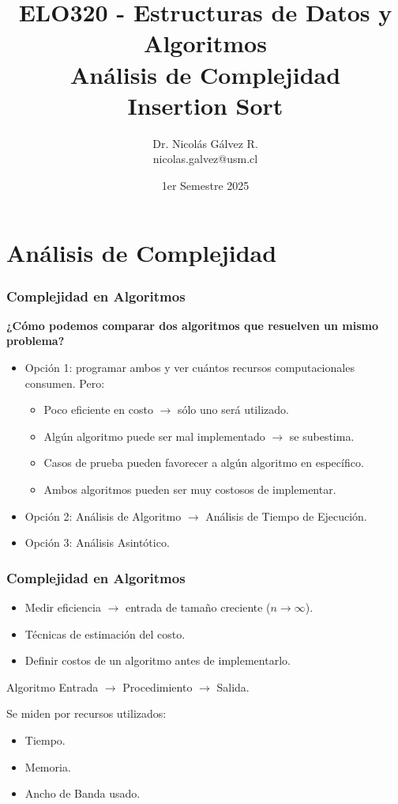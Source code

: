 \documentclass{beamer}
\title{ELO320 - Estructuras de Datos y Algoritmos\\Análisis de Complejidad\\\small{Insertion Sort}}
\author{Dr. Nicolás Gálvez R.\\{\small nicolas.galvez@usm.cl}}
\institute{Ing. Civil Telemática - Departamento de Electrónica}
\date{1er Semestre 2025}
\begin{document}
\frame{\titlepage}

%
%

\section{Análisis de Complejidad}
\begin{frame}[fragile]
 \frametitle{Complejidad en Algoritmos}
\small
\textbf{¿Cómo podemos comparar dos algoritmos que resuelven un mismo problema?} \pause

\begin{itemize}
\item Opción 1: programar ambos y ver cuántos recursos computacionales consumen. Pero:\pause
\begin{itemize}
\item Poco eficiente en costo $\rightarrow$ sólo uno será utilizado. \pause
\item Algún algoritmo puede ser mal implementado $\rightarrow$ se subestima. \pause
\item Casos de prueba pueden favorecer a algún algoritmo en específico. \pause
\item Ambos algoritmos pueden ser muy costosos de implementar. \pause
\end{itemize}
\smallskip
\item Opción 2: Análisis de Algoritmo $\rightarrow$ Análisis de Tiempo de Ejecución.\pause
\item Opción 3: Análisis Asintótico.
\end{itemize}
\end{frame}


\begin{frame}[fragile]
 \frametitle{Complejidad en Algoritmos}
\small
\begin{itemize}
\item Medir eficiencia $\rightarrow$ entrada de tamaño creciente ($n \rightarrow \infty$). 
\item Técnicas de estimación del costo.
\item Definir costos de un algoritmo antes de implementarlo.
\end{itemize}

\begin{block}{Algoritmo}
\medskip
\centering Entrada $\rightarrow$ Procedimiento $\rightarrow$ Salida.
\medskip
\end{block}

Se miden por recursos utilizados:
\begin{itemize}
\item Tiempo.
\item Memoria.
\item Ancho de Banda usado.
\end{itemize}
\end{frame}
\end{document}
